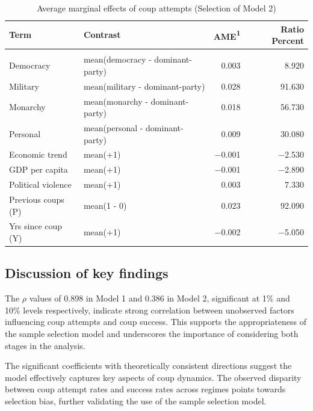 \documentclass[
  12pt,
]{report}
\begin{document}
\begin{longtable}[]{@{}llrr@{}}

\caption{\label{tbl-mfx2}Average marginal effects of coup attempts
(Selection of Model 2)}

\tabularnewline

\toprule\noalign{}
Term & Contrast & AME{\textsuperscript{1}} & Ratio Percent \\
\midrule\noalign{}
\endhead
\midrule\noalign{}
\multicolumn{4}{@{}l@{}}{%
{\textsuperscript{1}} AME: Average Marginal Effect} \\
\bottomrule\noalign{}
\endlastfoot
Democracy & mean(democracy - dominant-party) & 0.003 & 8.920 \\
Military & mean(military - dominant-party) & 0.028 & 91.630 \\
Monarchy & mean(monarchy - dominant-party) & 0.018 & 56.730 \\
Personal & mean(personal - dominant-party) & 0.009 & 30.080 \\
Economic trend & mean(+1) & −0.001 & −2.530 \\
GDP per capita & mean(+1) & −0.001 & −2.890 \\
Political violence & mean(+1) & 0.003 & 7.330 \\
Previous coups (P) & mean(1 - 0) & 0.023 & 92.090 \\
Yrs since coup (Y) & mean(+1) & −0.002 & −5.050 \\

\end{longtable}

\subsection{Discussion of key
findings}\label{discussion-of-key-findings}

The \(ρ\) values of 0.898 in Model 1 and 0.386 in Model 2, significant
at 1\% and 10\% levels respectively, indicate strong correlation between
unobserved factors influencing coup attempts and coup success. This
supports the appropriateness of the sample selection model and
underscores the importance of considering both stages in the analysis.

The significant coefficients with theoretically consistent directions
suggest the model effectively captures key aspects of coup dynamics. The
observed disparity between coup attempt rates and success rates across
regimes points towards selection bias, further validating the use of the
sample selection model.
\end{document}
